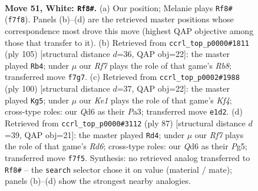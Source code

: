 \documentclass[11pt]{article}
\begin{document}
\clearpage

\begin{figure}[p]\centering
\begin{subfigure}{0.46\textwidth}\centering
\resizebox{\linewidth}{!}{%
\newchessgame
\chessboard[
  setfen={4k3/5R2/3Q4/3P4/8/4r1p1/P1P1p1P1/4K3 w - - 3 51},
  showmover=false,
  pgfstyle=straightmove, color=movearrow, markmove={f7-f8}
]}
\caption{}
\end{subfigure}\hfill
\begin{subfigure}{0.46\textwidth}\centering
\resizebox{\linewidth}{!}{%
\newchessgame
\chessboard[
  setfen={6k1/8/5p2/1PR5/5Ppp/8/2K3P1/1r6 b - - 1 53},
  showmover=false,
  pgfstyle=straightmove, color=movearrow, markmove={b1-b4}
]}
\caption{}
\end{subfigure}
\\[4pt]
\begin{subfigure}{0.46\textwidth}\centering
\resizebox{\linewidth}{!}{%
\newchessgame
\chessboard[
  setfen={8/5k2/6R1/1pr2p1P/5K2/P1P5/8/8 w - - 3 51},
  showmover=false,
  pgfstyle=straightmove, color=movearrow, markmove={f4-g5}
]}
\caption{}
\end{subfigure}\hfill
\begin{subfigure}{0.46\textwidth}\centering
\resizebox{\linewidth}{!}{%
\newchessgame
\chessboard[
  setfen={8/3k4/R2P1p2/P5p1/2p1P1P1/3r4/4K3/8 b - - 3 44},
  showmover=false,
  pgfstyle=straightmove, color=movearrow, markmove={d3-d4}
]}
\caption{}
\end{subfigure}
\caption{\textbf{Move 51, White: \texttt{Rf8\#}.} (a) Our position; Melanie plays \texttt{Rf8\#} (\texttt{f7f8}). Panels (b)--(d) are the retrieved master positions whose correspondence most drove this move (highest QAP objective among those that transfer to it). (b) Retrieved from \texttt{ccrl\_top\_p0000\#1811} (ply 105) [structural distance $d$=36, QAP obj=22]: the master played \texttt{Rb4}; under $\mu$ our \emph{Rf7} plays the role of that game's \emph{Rb8}; transferred move \texttt{f7g7}. (c) Retrieved from \texttt{ccrl\_top\_p0002\#1988} (ply 100) [structural distance $d$=37, QAP obj=22]: the master played \texttt{Kg5}; under $\mu$ our \emph{Ke1} plays the role of that game's \emph{Kf4}; cross-type roles: our \emph{Q}d6 as their \emph{P}a3; transferred move \texttt{e1d2}. (d) Retrieved from \texttt{ccrl\_top\_p0000\#3112} (ply 87) [structural distance $d$=39, QAP obj=21]: the master played \texttt{Rd4}; under $\mu$ our \emph{Rf7} plays the role of that game's \emph{Rd6}; cross-type roles: our \emph{Q}d6 as their \emph{P}g5; transferred move \texttt{f7f5}. Synthesis: no retrieved analog transferred to \texttt{Rf8\#} -- the \texttt{search} selector chose it on value (material / mate); panels (b)--(d) show the strongest nearby analogies.}
\label{fig:thought-m100}
\end{figure}
\end{document}
